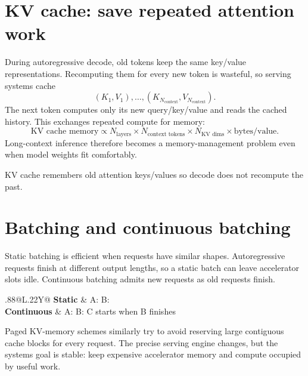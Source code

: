 \section{KV cache: save repeated attention work}
\label{sec:inference-kv-cache}
During autoregressive decode, old tokens keep the same key/value representations.
Recomputing them for every new token is wasteful, so serving systems cache
\[
(K_1,V_1),\ldots,(K_{N_{\text{context}}},V_{N_{\text{context}}}).
\]
The next token computes only its new query/key/value and reads the cached history.
This exchanges repeated compute for memory:
\[
\boxed{
\text{KV cache memory}
\propto
N_{\text{layers}}
\times
N_{\text{context tokens}}
\times
N_{\text{KV dims}}
\times
\text{bytes/value}
}.
\]
Long-context inference therefore becomes a memory-management problem even when model weights fit comfortably.

\begin{calloutmemoryhook}
KV cache remembers old attention keys/values so decode does not recompute the past.
\end{calloutmemoryhook}

\section{Batching and continuous batching}
\label{sec:inference-continuous-batching}
Static batching is efficient when requests have similar shapes.
Autoregressive requests finish at different output lengths, so a static batch can leave accelerator slots idle.
Continuous batching admits new requests as old requests finish.

\begin{center}
\small
\begin{tabularx}{.88\linewidth}{@{}L{.22\linewidth}Y@{}}
\toprule
\textbf{Static} & A: \code{============}\quad B: \code{===\phantom{=========}} \\
\textbf{Continuous} & A: \code{============}\quad B: \code{===}\quad C starts when B finishes \\
\bottomrule
\end{tabularx}
\end{center}

Paged KV-memory schemes similarly try to avoid reserving large contiguous cache blocks for every request.
The precise serving engine changes, but the systems goal is stable: keep expensive accelerator memory and compute occupied by useful work.

